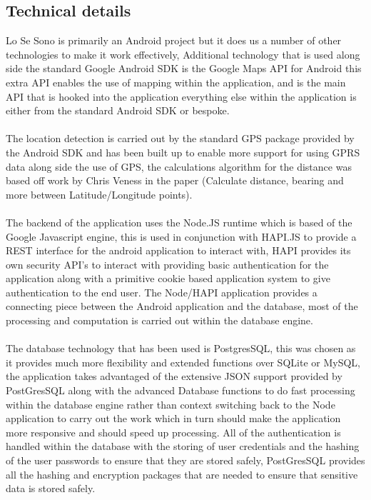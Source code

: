 \documentclass[a0,landscape]{a0poster}
\begin{document}
\begin{multicols}{5}
\section{Technical details}

Lo Se Sono is primarily an Android project but it does us a number of other technologies to make it work effectively, Additional technology that is used along side the standard Google Android SDK is the Google Maps API for Android this extra API enables the use of mapping within the application, and is the main API that is hooked into the application everything else within the application is either from the standard Android SDK or bespoke.\\ 
\\
The location detection is carried out by the standard GPS package provided by the Android SDK and has been built up to enable more support for using GPRS data along side the use of GPS, the calculations algorithm for the distance was based off work by Chris Veness in the paper (Calculate distance, bearing and more between Latitude/Longitude points).\\
\\
The backend of the application uses the Node.JS runtime which is based of the Google Javascript engine, this is used in conjunction with HAPI.JS to provide a REST interface for the android application to interact with, HAPI provides its own security API's to interact with providing basic authentication for the application along with a primitive cookie based application system to give authentication to the end user. The Node/HAPI application provides a connecting piece between the Android application and the database, most of the processing and computation is carried out within the database engine.\\
\\
The database technology that has been used is PostgresSQL, this was chosen as it provides much more flexibility and extended functions over SQLite or MySQL, the application takes advantaged of the extensive JSON support provided by PostGresSQL along with the advanced Database functions to do fast processing within the database engine rather than context switching back to the Node application to carry out the work which in turn should make the application more responsive and should speed up processing. All of the authentication is handled within the database with the storing of user credentials and the hashing of the user passwords to ensure that they are stored safely, PostGresSQL provides all the hashing and encryption packages that are needed to ensure that sensitive data is stored safely.


\end{multicols}
\end{document}
